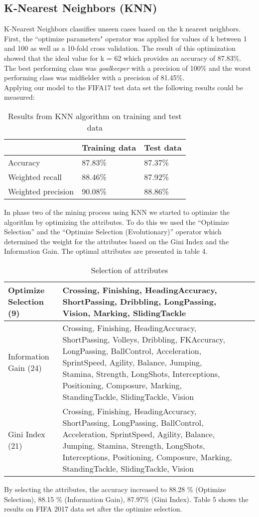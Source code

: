 
\subsection{K-Nearest Neighbors (KNN)}
\label{sec:KNN}
K-Nearest Neighbors classifies unseen cases based on the k nearest neighbors. 
First, the ``optimize parameters" operator was applied for values of k between 1 and 100 as well as a 10-fold cross validation. The result of this optimization showed that the ideal value for k = 62 which provides an accuracy of 87.83\%. The best performing class was \textit{goalkeeper} with a precision of 100\% and the worst performing class was midfielder with a precision of 81.45\%. \\
Applying our model to the FIFA17 test data set the following results could be measured:\\
\begin{table}[H]
\label{Tab:knn}
\centering
\begin{tabular}{@{}lll@{}}
\toprule
                   & Training data & Test data \\ \midrule
Accuracy           & 87.83\%       & 87.37\%   \\
Weighted recall    & 88.46\%       & 87.92\%   \\
Weighted precision & 90.08\%       & 88.86\%   \\ \bottomrule
\end{tabular}
\caption{Results from KNN algorithm on training and test data}
\end{table}
In phase two of the mining process using KNN we started to optimize the algorithm by optimizing the attributes.
To do this we used the ``Optimize Selection'' and the ``Optimize Selection (Evolutionary)'' operator which determined the weight for the attributes based on the Gini Index and the Information Gain.
The optimal attributes are presented in table 4.
\begin{table}[H]
\begin{tabular}{p{3.5cm}|p{7.5cm}l|l}
\hline 
Optimize Selection (9) & Crossing, Finishing, HeadingAccuracy, ShortPassing, Dribbling, LongPassing, Vision, Marking, SlidingTackle\\
\hline
Information Gain (24)& Crossing, Finishing, HeadingAccuracy, ShortPassing, Volleys, Dribbling, FKAccuracy, LongPassing, BallControl, Acceleration, SprintSpeed, Agility, Balance, Jumping, Stamina, Strength, LongShots, Interceptions, Positioning, Composure, Marking, StandingTackle, SlidingTackle, Vision \\
\hline 
Gini Index (21) & Crossing, Finishing, HeadingAccuracy, ShortPassing, LongPassing, BallControl, Acceleration, SprintSpeed, Agility, Balance, Jumping, Stamina, Strength, LongShots, Interceptions, Positioning, Composure, Marking, StandingTackle, SlidingTackle, Vision\\ \hline
\end{tabular}
\label{Tab:knn2}
\caption{Selection of attributes}
\end{table}	
By selecting the attributes, the accuracy increased to 88.28 \% (Optimize Selection), 88.15 \% (Information Gain), 87.97\% (Gini Index). Table 5 shows the results on FIFA 2017 data set after the optimize selection.

